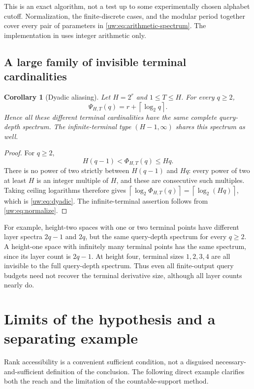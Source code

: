 \documentclass[11pt,letterpaper]{article}
\numberwithin{equation}{section}
\newtheorem{corollary}[corollary]{Corollary}
\theoremstyle{definition}
\theoremstyle{remark}
\theoremstyle{definition}
\newcommand{\ceil}[1]{\left\lceil#1\right\rceil}
\begin{document}
This is an exact algorithm, not a test up to some experimentally chosen
alphabet cutoff. Normalization, the finite-discrete cases, and the modular
period together cover every pair of parameters in \eqref{uw:eq:arithmetic-spectrum}.
The implementation in  uses integer arithmetic only.

\subsection{A large family of invisible terminal cardinalities}
\begin{corollary}[Dyadic aliasing]\label{uw:cor:dyadic}
Let $H=2^r$ and $1\le T\le H$. For every $q\ge2$,
\begin{equation}\label{uw:eq:dyadic}
 \Psi_{H,T}(q)=r+\ceil{\log_2q}.
\end{equation}
Hence all these different terminal cardinalities have the same complete
query-depth spectrum. The infinite-terminal type $(H-1,\infty)$ shares this
spectrum as well.
\end{corollary}
\begin{proof}
For $q\ge2$,
\[
 H(q-1)<\Phi_{H,T}(q)\le Hq.
\]
There is no power of two strictly between $H(q-1)$ and $Hq$: every power of
two at least $H$ is an integer multiple of $H$, and these are consecutive
such multiples. Taking ceiling logarithms therefore gives
$\ceil{\log_2 \Phi_{H,T}(q)}=\ceil{\log_2(Hq)}$, which is
\eqref{uw:eq:dyadic}. The infinite-terminal assertion follows from
\eqref{uw:eq:normalize}.
\end{proof}

For example, height-two spaces with one or two terminal points have different
layer spectra $2q-1$ and $2q$, but the same query-depth spectrum for every
$q\ge2$. A height-one space with infinitely many terminal points has the
same spectrum, since its layer count is $2q-1$. At height four, terminal
sizes $1,2,3,4$ are all invisible to the full query-depth spectrum. Thus even
all finite-output query budgets need not recover the terminal derivative
size, although all layer counts nearly do.

\section{Limits of the hypothesis and a separating example}\label{uw:sec:limits}

Rank accessibility is a convenient sufficient condition, not a disguised
necessary-and-sufficient definition of the conclusion. The following direct
example clarifies both the reach and the limitation of the countable-support
method.
\end{document}

